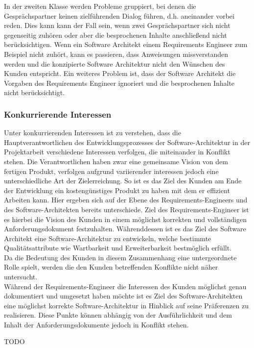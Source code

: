 In der zweiten Klasse werden Probleme gruppiert, bei denen die Gesprächspartner keinen zielführenden Dialog führen, d.h. aneinander vorbei reden. Dies kann kann der Fall sein, wenn zwei Gesprächspartner sich nicht gegenseitig zuhören oder aber die besprochenen Inhalte anschließend nicht berücksichtigen. Wenn ein Software Architekt einem Requirements Engineer zum Beispiel nicht zuhört, kann es passieren, dass Anweisungen missverstanden werden und die konzipierte Software Architektur nicht den Wünschen des Kunden entspricht. Ein weiteres Problem ist, dass der Software Architekt die Vorgaben des Requirements Engineer ignoriert und die besprochenen Inhalte nicht berücksichtigt. \\

\subsubsection{Konkurrierende Interessen}
Unter konkurrierenden Interessen ist zu verstehen, dass die Hauptverantwortlichen des Entwicklungsprozesses der Software-Architektur in der Projektarbeit verschiedene Interessen verfolgen, die miteinander in Konflikt stehen. Die Verantwortlichen haben zwar eine gemeinsame Vision von dem fertigen Produkt, verfolgen aufgrund variierender interessen jedoch eine unterschiedliche Art der Zielerreichung.
So ist es das Ziel des Kunden am Ende der Entwicklung ein kostengünstiges Produkt zu haben mit dem er effizient Arbeiten kann. Hier ergeben sich auf der Ebene des Requirements-Engineers und des Software-Architekten bereits unterschiede. Ziel des Requirements-Engineer ist es hierbei die Vision des Kunden in einem möglichst korrekten und vollständigen Anforderungsdokument festzuhalten. Währenddessen ist es das Ziel des Software Architekt eine Software-Architektur zu entwickeln, welche bestimmte Qualitätsattribute wie Wartbarkeit und Erweiterbarkeit bestmöglich erfüllt. \\
Da die Bedeutung des Kunden in diesem Zusammenhang eine untergeordnete Rolle spielt, werden die den Kunden betreffenden Konflikte nicht näher untersucht. \\
Während der Requirements-Engineer die Interessen des Kunden möglichst genau dokumentiert und umgesetzt haben möchte ist es Ziel des Software-Architekten eine möglichst korrekte Software-Architektur in Hinblick auf seine Präferenzen zu realisieren. Diese Punkte können abhängig von der Ausführlichkeit und dem Inhalt der Anforderungsdokumente jedoch in Konflikt stehen.

TODO \\

